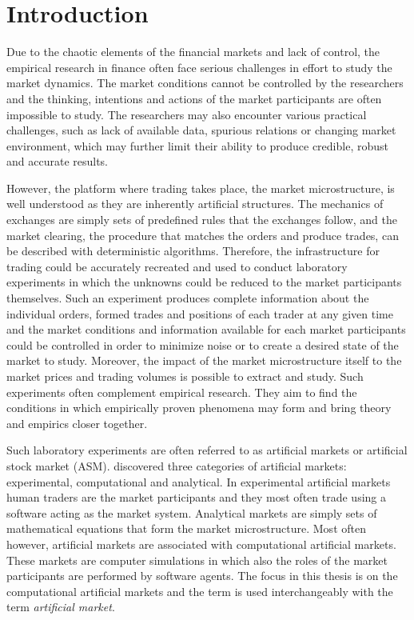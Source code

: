 \section{Introduction}

Due to the chaotic elements of the financial markets and lack of control, the 
empirical research in finance often face serious challenges in effort to study the %
market dynamics. The market conditions cannot be controlled by the researchers
and the thinking, intentions and actions of the market participants are often impossible to study. 
The researchers may also encounter various practical challenges, such as 
lack of available data, spurious relations or changing market environment, 
which may further limit their ability to produce credible, robust and accurate results. 

However, the platform where trading takes place, the market
microstructure, is well understood as they are inherently artificial structures. 
The mechanics of exchanges are simply sets of predefined rules 
that the exchanges follow, and the market clearing, the procedure 
that matches the orders and produce trades, can be described with 
deterministic algorithms. Therefore, the infrastructure for trading
could be accurately recreated and used to conduct laboratory 
experiments in which the unknowns could be reduced to the market participants
themselves. Such an experiment produces complete information about
the individual orders, formed trades and positions of each trader at any given time
and the market conditions and information available for each market participants could
be controlled in order to minimize noise or to create a desired state of the market to
study. Moreover, the impact of the market microstructure itself to the market prices and trading 
volumes is possible to extract and study. Such experiments often complement empirical research. %
They aim to find the conditions in which empirically proven phenomena may form and 
bring theory and empirics closer together. 


Such laboratory experiments are often referred to as artificial markets or artificial
stock market (ASM). \citet{boer05} discovered three categories of artificial markets: 
experimental, computational and analytical. In experimental artificial markets human traders
are the market participants and they most often trade using a software acting as
the market system. Analytical markets are simply sets of mathematical equations that
form the market microstructure. Most often however, artificial markets are associated with 
computational artificial markets. These markets are computer simulations in which 
also the roles of the market participants are performed by software agents. The focus in this
thesis is on the computational artificial markets and the term is used interchangeably
with the term \textit{artificial market}. 

